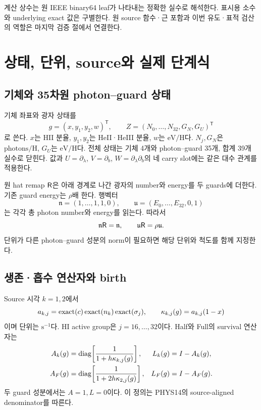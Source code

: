계산 상수는 원 IEEE binary64 leaf가 나타내는 정확한 실수로 해석한다. 표시용 소수와 underlying exact 값은 구별한다. 원 source 함수·근 포함과 이번 유도·표적 검산의 역할은 마지막 검증 절에서 연결한다.

\section{상태, 단위, source와 실제 단계식}\label{sec:stages}
\subsection{기체와 35차원 photon--guard 상태}
기체 좌표와 광자 상태를
\begin{equation}
g=(x,y_1,y_2,w)^{\mathsf T},\qquad
Z=(N_0,\ldots,N_{32},G_N,G_U)^{\mathsf T}
\label{eq:states}
\end{equation}
로 쓴다. $x$는 HII 분율, $y_1,y_2$는 HeII·HeIII 분율, $w$는 $\mathrm{eV/H}$다. $N_j,G_N$은 $\mathrm{photons/H}$, $G_U$는 $\mathrm{eV/H}$다. 전체 상태는 기체 4개와 photon--guard 35개, 합계 39개 실수로 닫힌다. 값과 $U=\partial_\lambda$, $V=\partial_b$, $W=\partial_\lambda\partial_b$의 네 carry slot에는 같은 대수 관계를 적용한다.

원 hat remap $\mathsf R$은 아래 경계로 나간 광자의 number와 energy를 두 guards에 더한다. 기존 guard energy는 $\rho$배 한다. 행벡터
\begin{equation}
\mathfrak n=(1,\ldots,1,1,0),\qquad
\mathfrak u=(E_0,\ldots,E_{32},0,1)
\label{eq:rows}
\end{equation}
는 각각 총 photon number와 energy를 읽는다. 따라서
\begin{equation}
\mathfrak n\mathsf R=\mathfrak n,\qquad \mathfrak u\mathsf R=\rho\mathfrak u.
\label{eq:remapmom}
\end{equation}
단위가 다른 photon--guard 성분의 norm이 필요하면 해당 단위와 척도를 함께 지정한다.

\subsection{생존·흡수 연산자와 birth}
Source 시각 $k=1,2$에서
\begin{equation}
a_{k,j}=\operatorname{exact}(c)\operatorname{exact}(n_k)\operatorname{exact}(\sigma_j),\qquad
\kappa_{k,j}(g)=a_{k,j}(1-x)
\label{eq:opacity}
\end{equation}
이며 단위는 $\mathrm{s}^{-1}$다. HI active group은 $j=16,\ldots,32$이다. Half와 Full의 survival 연산자는
\begin{align}
A_k(g)&=\operatorname{diag}\!\left[\frac1{1+h\kappa_{k,j}(g)}\right],
&L_k(g)&=I-A_k(g),\label{eq:halfA}\\
A_F(g)&=\operatorname{diag}\!\left[\frac1{1+2h\kappa_{2,j}(g)}\right],
&L_F(g)&=I-A_F(g).
\label{eq:fullA}
\end{align}
두 guard 성분에서는 $A=1,L=0$이다. 이 정의는 PHYS14의 source-aligned denominator를 따른다.

